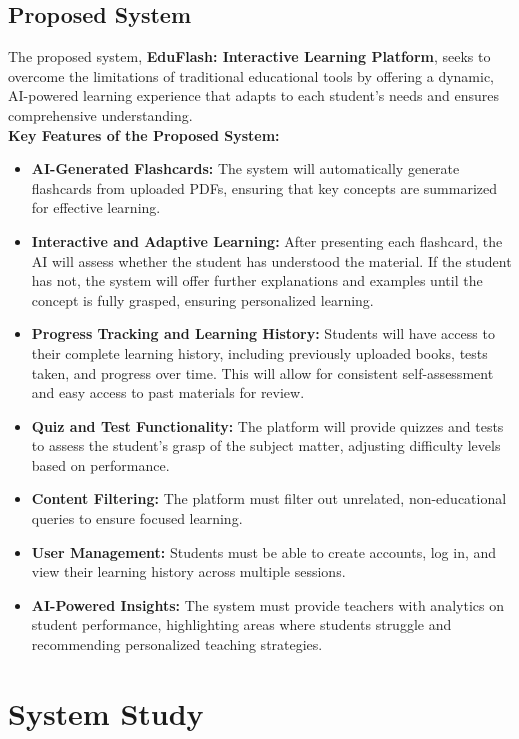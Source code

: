 \documentclass{report}
\begin{document}
\section{Proposed System}
The proposed system, \textbf{EduFlash: Interactive Learning Platform}, seeks to overcome the limitations of traditional educational tools by offering a dynamic, AI-powered learning experience that adapts to each student’s needs and ensures comprehensive understanding.
\\
\textbf{Key Features of the Proposed System:}
\begin{itemize}
    \item \textbf{AI-Generated Flashcards:} The system will automatically generate flashcards from uploaded PDFs, ensuring that key concepts are summarized for effective learning.
    \item \textbf{Interactive and Adaptive Learning:} After presenting each flashcard, the AI will assess whether the student has understood the material. If the student has not, the system will offer further explanations and examples until the concept is fully grasped, ensuring personalized learning.
    \item \textbf{Progress Tracking and Learning History:} Students will have access to their complete learning history, including previously uploaded books, tests taken, and progress over time. This will allow for consistent self-assessment and easy access to past materials for review.
    \item \textbf{Quiz and Test Functionality:} The platform will provide quizzes and tests to assess the student’s grasp of the subject matter, adjusting difficulty levels based on performance.
    \item \textbf{Content Filtering:} The platform must filter out unrelated, non-educational queries to ensure focused learning.
    \item \textbf{User Management:} Students must be able to create accounts, log in, and view their learning history across multiple sessions.
    \item \textbf{AI-Powered Insights:} The system must provide teachers with analytics on student performance, highlighting areas where students struggle and recommending personalized teaching strategies.
\end{itemize}

\chapter{System Study}
\end{document}

